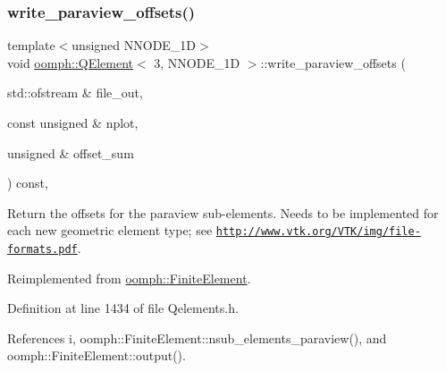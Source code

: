 \subsubsection{\texorpdfstring{write\+\_\+paraview\+\_\+offsets()}{write\_paraview\_offsets()}}
{\footnotesize\ttfamily template$<$unsigned N\+N\+O\+D\+E\+\_\+1D$>$ \\
void \hyperlink{classoomph_1_1QElement}{oomph\+::\+Q\+Element}$<$ 3, N\+N\+O\+D\+E\+\_\+1D $>$\+::write\+\_\+paraview\+\_\+offsets (\begin{DoxyParamCaption}\item[{std\+::ofstream \&}]{file\+\_\+out,  }\item[{const unsigned \&}]{nplot,  }\item[{unsigned \&}]{offset\+\_\+sum }\end{DoxyParamCaption}) const\hspace{0.3cm}{\ttfamily [inline]}, {\ttfamily [virtual]}}



Return the offsets for the paraview sub-\/elements. Needs to be implemented for each new geometric element type; see \href{http://www.vtk.org/VTK/img/file-formats.pdf}{\tt http\+://www.\+vtk.\+org/\+V\+T\+K/img/file-\/formats.\+pdf}. 



Reimplemented from \hyperlink{classoomph_1_1FiniteElement_af11d35779224185e6693f2db450cc111}{oomph\+::\+Finite\+Element}.



Definition at line 1434 of file Qelements.\+h.



References i, oomph\+::\+Finite\+Element\+::nsub\+\_\+elements\+\_\+paraview(), and oomph\+::\+Finite\+Element\+::output().

\mbox{\label{classoomph_1_1QElement_3_013_00_01NNODE__1D_01_4_af7668b4257246d397fc5302bed22c5b5}} 
